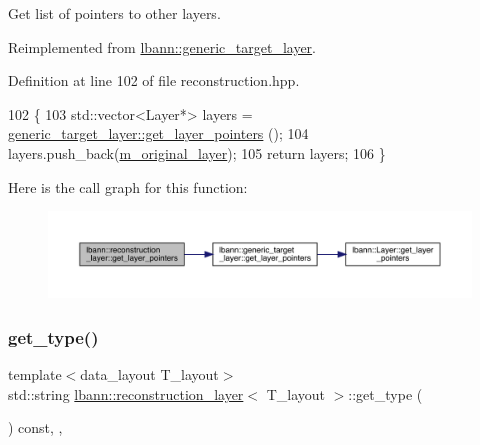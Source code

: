 Get list of pointers to other layers. 

Reimplemented from \hyperlink{classlbann_1_1generic__target__layer_a0325a9703238ac0120893214fd0983b5}{lbann\+::generic\+\_\+target\+\_\+layer}.



Definition at line 102 of file reconstruction.\+hpp.


\begin{DoxyCode}
102                                                   \{
103     std::vector<Layer*> layers = \hyperlink{classlbann_1_1generic__target__layer_a0325a9703238ac0120893214fd0983b5}{generic\_target\_layer::get\_layer\_pointers}
      ();
104     layers.push\_back(\hyperlink{classlbann_1_1reconstruction__layer_a077a29792de2a39015da8b18120a00e3}{m\_original\_layer});
105     \textcolor{keywordflow}{return} layers;
106   \}
\end{DoxyCode}
Here is the call graph for this function\+:\nopagebreak
\begin{figure}[H]
\begin{center}
\leavevmode
\includegraphics[width=350pt]{classlbann_1_1reconstruction__layer_a52f5ebe2f2716b8cab5e768b1b82c3d0_cgraph}
\end{center}
\end{figure}
\mbox{\label{classlbann_1_1reconstruction__layer_a5f3bced2474caea9b728639633ac25ce}} 
\subsubsection{\texorpdfstring{get\+\_\+type()}{get\_type()}}
{\footnotesize\ttfamily template$<$data\+\_\+layout T\+\_\+layout$>$ \\
std\+::string \hyperlink{classlbann_1_1reconstruction__layer}{lbann\+::reconstruction\+\_\+layer}$<$ T\+\_\+layout $>$\+::get\+\_\+type (\begin{DoxyParamCaption}{ }\end{DoxyParamCaption}) const\hspace{0.3cm}{\ttfamily [inline]}, {\ttfamily [override]}, {\ttfamily [virtual]}}

